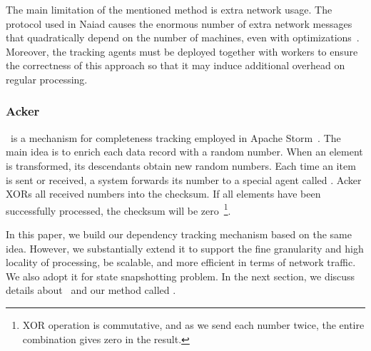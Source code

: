 The main limitation of the mentioned method is extra network usage. The protocol used in Naiad causes the enormous number of extra network messages that quadratically depend on the number of machines, even with optimizations~\cite{Murray:2013:NTD:2517349.2522738}. Moreover, the tracking agents must be deployed together with workers to ensure the correctness of this approach so that it may induce additional overhead on regular processing.

\subsubsection{Acker}

\acker\ is a mechanism for completeness tracking employed in Apache Storm~\cite{apache:storm}. The main idea is to enrich each data record with a random number. When an element is transformed, its descendants obtain new random numbers. Each time an item is sent or received, a system forwards its number to a special agent called {\em \acker}. Acker XORs all received numbers into the checksum. If all elements have been successfully processed, the checksum will be zero~\footnote{XOR operation is commutative, and as we send each number twice, the entire combination gives zero in the result.}. 

In this paper, we build our dependency tracking mechanism based on the same idea. However, we substantially extend it to support the fine granularity and high locality of processing, be scalable, and more efficient in terms of network traffic. We also adopt it for state snapshotting problem. In the next section, we discuss details about \acker\ and our method called \tracker .